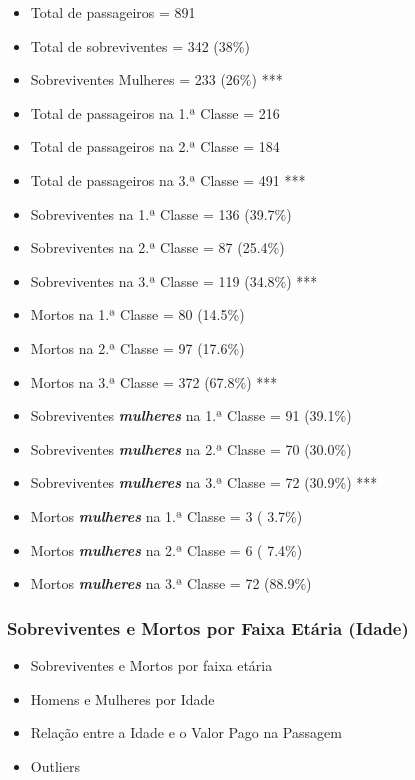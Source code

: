 \documentclass[11pt]{article}
\providecommand{\tightlist}{%
      \setlength{\itemsep}{0pt}\setlength{\parskip}{0pt}}
\begin{document}
\begin{itemize}
\tightlist
\item
  Total de passageiros = 891
\item
  Total de sobreviventes = 342 (38\%)
\item
  Sobreviventes Mulheres = 233 (26\%) ***
\item
  Total de passageiros na 1.ª Classe = 216
\item
  Total de passageiros na 2.ª Classe = 184
\item
  Total de passageiros na 3.ª Classe = 491 ***
\item
  Sobreviventes na 1.ª Classe = 136 (39.7\%)
\item
  Sobreviventes na 2.ª Classe = 87 (25.4\%)
\item
  Sobreviventes na 3.ª Classe = 119 (34.8\%) ***
\item
  Mortos na 1.ª Classe = 80 (14.5\%)
\item
  Mortos na 2.ª Classe = 97 (17.6\%)
\item
  Mortos na 3.ª Classe = 372 (67.8\%) ***
\item
  Sobreviventes \textbf{\emph{mulheres}} na 1.ª Classe = 91 (39.1\%)
\item
  Sobreviventes \textbf{\emph{mulheres}} na 2.ª Classe = 70 (30.0\%)
\item
  Sobreviventes \textbf{\emph{mulheres}} na 3.ª Classe = 72 (30.9\%) ***
\item
  Mortos \textbf{\emph{mulheres}} na 1.ª Classe = 3 ( 3.7\%)
\item
  Mortos \textbf{\emph{mulheres}} na 2.ª Classe = 6 ( 7.4\%)
\item
  Mortos \textbf{\emph{mulheres}} na 3.ª Classe = 72 (88.9\%)
\end{itemize}

    \subsubsection{Sobreviventes e Mortos por Faixa Etária
(Idade)}\label{sobreviventes-e-mortos-por-faixa-etuxe1ria-idade}

\begin{itemize}
\tightlist
\item
  Sobreviventes e Mortos por faixa etária
\item
  Homens e Mulheres por Idade\\
\item
  Relação entre a Idade e o Valor Pago na Passagem
\item
  Outliers
\end{itemize}
\end{document}
